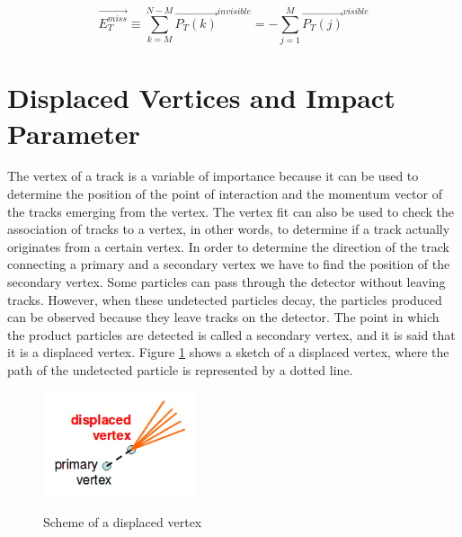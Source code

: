  \begin{equation}
  \vec{E_T^{miss}} \equiv \sum_{k=M}^{N-M}\vec{P_T(k)}^{invisible} = - \sum_{j=1}^M  \vec{P_T(j)}^{visible}
 \end{equation}

 
 \section{Displaced Vertices and Impact Parameter}
The vertex of a track is a variable of importance because it can be used to determine the position of the point of interaction and the momentum vector of the tracks emerging from the vertex. The 
vertex fit can also be used to check the association of tracks to a vertex, in other words, to determine if a track actually originates from a certain vertex. In order to determine the direction
of the track connecting a primary and a secondary vertex we have to find the position of the secondary vertex. Some particles can pass through the detector without leaving tracks. However,
when these undetected particles decay, the particles produced can be observed because they leave tracks on the detector. The point in which the product particles are detected is called a secondary 
vertex, and it is said that it is a displaced vertex. Figure \ref{Displaced_vertex} shows a sketch of a displaced vertex, where the path of the undetected particle is represented by a dotted line.

 
 
 \begin{figure}[h] 
 \centering
 \caption{Scheme of a displaced vertex}
 \includegraphics[width=0.4\textwidth]{./Capitulos/VariableDefinitions/Displaced_vertex} 
 \label{Displaced_vertex}
 \end{figure}
 
